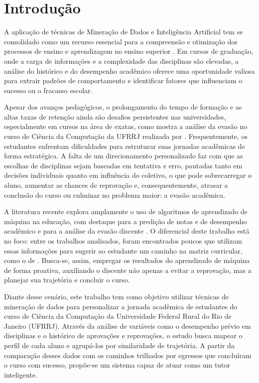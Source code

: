\section{Introdução}

A aplicação de técnicas de Mineração de Dados e Inteligência Artificial tem se consolidado como um recurso essencial para a compreensão e otimização dos processos de ensino e aprendizagem no ensino superior \citep{asif2017analyzing}. Em cursos de graduação, onde a carga de informações e a complexidade das disciplinas são elevadas, a análise do histórico e do desempenho acadêmico oferece uma oportunidade valiosa para extrair padrões de comportamento e identificar fatores que influenciam o sucesso ou o fracasso escolar.

Apesar dos avanços pedagógicos, o prolongamento do tempo de formação e as altas taxas de retenção ainda são desafios persistentes nas universidades, especialmente em cursos na área de exatas, como mostra a análise da evasão no curso de Ciência da Computação da UFRRJ realizada por \citet{zamith2025evasao}. Frequentemente, os estudantes enfrentam dificuldades para estruturar suas jornadas acadêmicas de forma estratégica. A falta de um direcionamento personalizado faz com que as escolhas de disciplinas sejam baseadas em tentativa e erro, pautadas tanto em decisões individuais quanto em influência do coletivo, o que pode sobrecarregar o aluno, aumentar as chances de reprovação e, consequentemente, atrasar a conclusão do curso ou culminar no problema maior: a evasão acadêmica.

A literatura recente explora amplamente o uso de algoritmos de aprendizado de máquina na educação, com destaque para a predição de notas e de desempenho acadêmico \citep{nachouki2023randomforest, asif2017analyzing} e para a análise da evasão discente \citep{zamith2025evasao}. O diferencial deste trabalho está no foco: entre os trabalhos analisados, foram encontrados poucos que utilizam essas informações para sugerir ao estudante um caminho na matriz curricular, como o de \citet{wagner2024courserecommender}. Busca-se, assim, empregar os resultados do aprendizado de máquina de forma proativa, auxiliando o discente não apenas a evitar a reprovação, mas a planejar sua trajetória e concluir o curso.

Diante desse cenário, este trabalho tem como objetivo utilizar técnicas de mineração de dados para personalizar a jornada acadêmica de estudantes do curso de Ciência da Computação da Universidade Federal Rural do Rio de Janeiro (UFRRJ). Através da análise de variáveis como o desempenho prévio em disciplinas e o histórico de aprovações e reprovações, o estudo busca mapear o perfil de cada aluno e agrupá-los por similaridade de trajetória. A partir da comparação desses dados com os caminhos trilhados por egressos que concluíram o curso com sucesso, propõe-se um sistema capaz de atuar como um tutor inteligente.

